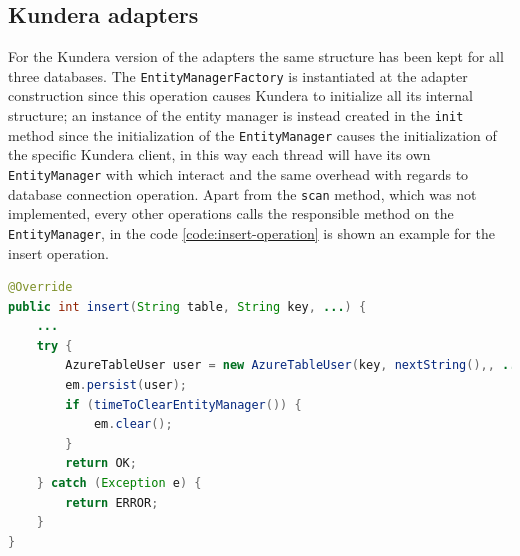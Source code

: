 \subsection{Kundera adapters}
For the Kundera version of the adapters the same structure has been kept for all three databases. The \texttt{EntityManagerFactory} is instantiated at the adapter construction since this operation causes Kundera to initialize all its internal structure; an instance of the entity manager is instead created in the \texttt{init} method since the initialization of the \texttt{EntityManager} causes the initialization of the specific Kundera client, in this way each thread will have its own \texttt{EntityManager} with which interact and the same overhead with regards to database connection operation.
Apart from the \texttt{scan} method, which was not implemented, every other operations calls the responsible method on the \texttt{EntityManager}, in the code \ref{code:insert-operation} is shown an example for the insert operation.

\begin{lstlisting}[language=Java, caption=Insert operation of the Azure Tables adapter, label=code:insert-operation]
@Override
public int insert(String table, String key, ...) {
    ...
    try {
        AzureTableUser user = new AzureTableUser(key, nextString(),, ...);
        em.persist(user);
        if (timeToClearEntityManager()) {
            em.clear();
        }
        return OK;
    } catch (Exception e) {
        return ERROR;
    }
}
\end{lstlisting}

